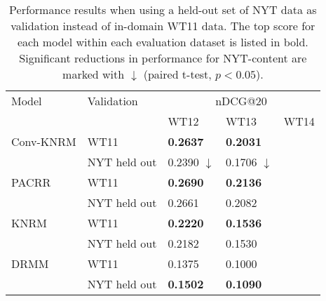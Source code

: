 \begin{table}
\centering
\small
\caption{Performance results when using a held-out set of NYT data as validation instead of in-domain WT11 data. The top score for each model within each evaluation dataset is listed in bold. Significant reductions in performance for NYT-content are marked with $\downarrow$ (paired t-test, $p<0.05$).}
\label{tab:validation}
\begin{tabular}{lllll}
\toprule
Model &   Validation & \multicolumn{3}{c}{nDCG@20}\\ \cmidrule(lr){3-5} 
        &&WT12 & WT13 & WT14 \\
\midrule



Conv-KNRM & WT11 & \bf0.2637  & \bf0.2031 \\
 & NYT held out & 0.2390 $\downarrow$ & 0.1706 $\downarrow$\\
\midrule
PACRR & WT11 & \bf0.2690  & \bf0.2136 \\
 & NYT held out & 0.2661  & 0.2082 \\
\midrule
KNRM & WT11 & \bf0.2220  & \bf0.1536 \\
 & NYT held out & 0.2182  & 0.1530 \\
\midrule
DRMM & WT11 & 0.1375  & 0.1000 \\
 & NYT held out & \bf0.1502  & \bf0.1090 \\
 
 
 

\bottomrule
    \end{tabular}
\end{table}